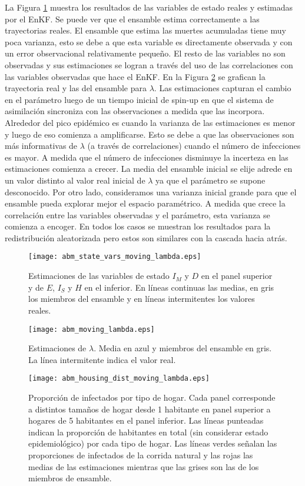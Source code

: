 La Figura \ref{fig:abm_state_vars_moving_lambda} muestra los resultados de las variables de estado reales y estimadas por el EnKF. Se puede ver que el ensamble estima correctamente a las trayectorias reales. El ensamble que estima las muertes acumuladas tiene muy poca varianza, esto se debe a que esta variable es directamente observada y con un error observacional relativamente pequeño. El resto de las variables no son observadas y sus estimaciones se logran a través del uso de las correlaciones con las variables observadas que hace el EnKF. En la Figura \ref{fig:abm_moving_lambda} se grafican la trayectoria real y las del ensamble para $\lambda$. Las estimaciones capturan el cambio en el parámetro luego de un tiempo inicial de spin-up en que el sistema de asimilación sincroniza con las observaciones a medida que las incorpora. Alrededor del pico epidémico es cuando la varianza de las estimaciones es menor y luego de eso comienza a amplificarse. Esto se debe a que las observaciones son más informativas de $\lambda$ (a través de correlaciones) cuando el número de infecciones es mayor. A medida que el número de infecciones disminuye la incerteza en las estimaciones comienza a crecer. La media del ensamble inicial se elije adrede en un valor distinto al valor real inicial de $\lambda$ ya que el parámetro se supone desconocido. Por otro lado, consideramos una varianza inicial grande para que el ensamble pueda explorar mejor el espacio paramétrico. A medida que crece la correlación entre las variables observadas y el parámetro, esta varianza se comienza a encoger. En todos los casos se muestran los resultados para la redistribución aleatorizada pero estos son similares con la cascada hacia atrás.
\begin{figure}[h!]
    \centering
    \texttt{[image: abm\_state\_vars\_moving\_lambda.eps]}
    \caption{Estimaciones de las variables de estado $I_M$ y $D$ en el panel superior y de $E$, $I_S$ y $H$ en el inferior. En líneas continuas las medias, en gris los miembros del ensamble y en líneas intermitentes los valores reales.}
    \label{fig:abm_state_vars_moving_lambda}
\end{figure}
\begin{figure}[h!]
    \centering
    \texttt{[image: abm\_moving\_lambda.eps]}
    \caption{Estimaciones de $\lambda$. Media en azul y miembros del ensamble en gris. La línea intermitente indica el valor real.}
    \label{fig:abm_moving_lambda}
\end{figure}
\begin{figure}[h!]
    \centering
    \texttt{[image: abm\_housing\_dist\_moving\_lambda.eps]}
    \caption{Proporción de infectados por tipo de hogar. Cada panel corresponde a distintos tamaños de hogar desde 1 habitante en panel superior a hogares de 5 habitantes en el panel inferior. Las líneas punteadas indican la proporción de habitantes en total (sin considerar estado epidemiológico) por cada tipo de hogar. Las líneas verdes señalan las proporciones de infectados de la corrida natural y las rojas las medias de las estimaciones mientras que las grises son las de los miembros de ensamble.}
    \label{fig:abm_housing_dist_moving_lambda}
\end{figure}

